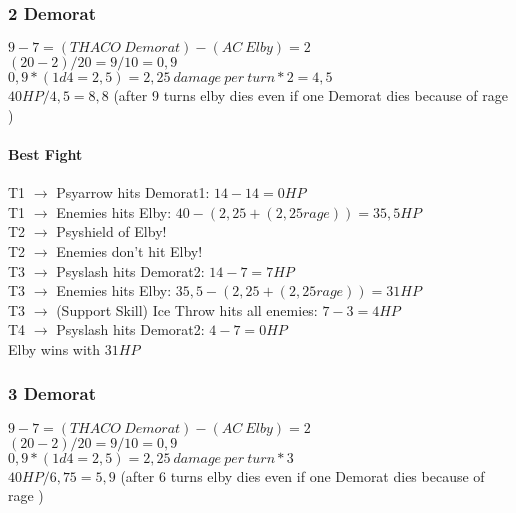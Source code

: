 \subsubsection*{2 Demorat}
$9-7 = (THACO\:Demorat) - (AC\:Elby) = 2$\\
$(20-2)/20 =9/10 = 0,9$\\
$0,9 * (1d4 = 2,5) = 2,25\:damage\:per\:turn * 2 = 4,5$\\
$40 HP / 4,5 = 8,8$ (after 9 turns elby dies even if one Demorat dies because of rage )

\paragraph*{Best Fight\\}
T1 $\rightarrow$ Psyarrow hits Demorat1: $14-14 = 0 HP$\\
T1 $\rightarrow$ Enemies hits Elby: $40 - (2,25+(2,25 rage)) = 35,5 HP$\\
T2 $\rightarrow$ Psyshield of Elby!\\
T2 $\rightarrow$ Enemies don’t hit Elby!\\
T3 $\rightarrow$ Psyslash hits Demorat2: $14 - 7 = 7 HP$\\
T3 $\rightarrow$ Enemies hits Elby: $35,5 - (2,25+(2,25 rage)) = 31 HP$\\
T3 $\rightarrow$ (Support Skill) Ice Throw hits all enemies: $7 - 3 = 4 HP$\\
T4 $\rightarrow$ Psyslash hits Demorat2: $4-7= 0 HP$\\
Elby wins with $31 HP$

\subsubsection*{3 Demorat}
$9-7 = (THACO\:Demorat) - (AC\:Elby) = 2$\\
$(20-2)/20 =9/10 = 0,9$\\
$0,9 * (1d4 = 2,5) = 2,25\:damage\:per\:turn * 3$\\
$40 HP / 6,75 = 5,9$ (after 6 turns elby dies even if one Demorat dies because of rage )


